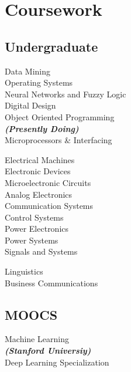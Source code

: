 \documentclass[]{limos-resume-openfont}
\begin{document}
\begin{minipage}[t]{0.33\textwidth}

\section{Coursework}

\subsection{Undergraduate}
Data Mining \\
Operating Systems \\
Neural Networks and Fuzzy Logic \\
Digital Design \\
Object Oriented Programming \\
{\footnotesize \textit{\textbf{(Presently Doing) }}} \\
Microprocessors \& Interfacing \\
\sectionsep

Electrical Machines\\
Electronic Devices\\
Microelectronic Circuits\\
Analog Electronics\\
Communication Systems\\
Control Systems\\
Power Electronics\\
Power Systems\\
Signals and Systems\\
\sectionsep

Linguistics\\
Business Communications\\
\sectionsep

\subsection{MOOCS}
Machine Learning\\
{\footnotesize \textit{\textbf{(Stanford Universiy) }}} \\
Deep Learning Specialization\\

%
%

\end{minipage} 
\end{document}
